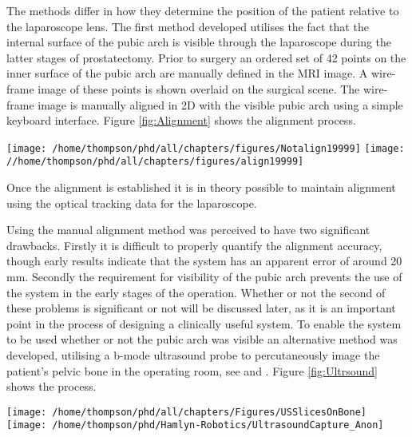 The methods differ in how they determine the position of the patient 
relative to the laparoscope lens. The first method developed utilises the 
fact that the internal surface of the pubic arch is visible through the 
laparoscope during the latter stages of prostatectomy. Prior to surgery an ordered  
set of 42 points on the inner surface of the pubic arch are manually defined in the MRI
image. A wire-frame image of these points is shown overlaid on the surgical scene. The 
wire-frame image is manually aligned in 2D with the visible pubic arch using a simple 
keyboard interface. Figure \ref{fig:Alignment} shows the alignment process. 
\begin{figure*}
\begin{center}
\texttt{[image: /home/thompson/phd/all/chapters/figures/Notalign19999]}
\texttt{[image: //home/thompson/phd/all/chapters/figures/align19999]}
\end{center}
\caption{\label{fig:Alignment}A set of 42 points on the inner surface of the pubic arch 
are manually identified in the MRI image. These form a wire frame that can be projected 
over the surgical scene. A simple user interface is then used to 
align the projected wire frame to the visible anatomy. 
The left hand image shows the wire frame and visible anatomy out of alignment, the right hand
image shows them after alignment. 
Alignment takes less than 30 seconds.}
\end{figure*}
Once the
alignment is established it is in theory possible to maintain alignment using the 
optical tracking data for the laparoscope. 

Using the manual alignment method was perceived to have two significant
drawbacks. Firstly it is 
difficult to properly quantify the alignment accuracy, though early results 
indicate that the system has an apparent error of around 20 mm. Secondly the 
requirement for visibility of the pubic arch prevents the use of the system in the 
early stages of the operation. Whether or not the second of these problems is 
significant or not will be discussed later, as it is an important point 
in the process of designing a clinically useful system.
To enable the system to be used whether or not the pubic arch was visible 
an alternative method was developed, utilising a b-mode ultrasound probe to 
percutaneously image the patient's pelvic bone in the operating room, 
see \cite{pap009} and \cite{pap170}. Figure 
\ref{fig:Ultrsound} shows the process. 
\begin{figure*}
\begin{center}
\texttt{[image: /home/thompson/phd/all/chapters/Figures/USSlicesOnBone]}
\texttt{[image: /home/thompson/phd/Hamlyn-Robotics/UltrasoundCapture\_Anon]}
\end{center}
\caption{\label{fig:Ultrsound}A set of ultrasound images of the patient's pelvic bone 
are acquired immediately prior to surgery, with the patient in the operating position. These
are aligned to a pseudo CT image of the patient's pelvis using an image to image registration 
algorithm.}
\end{figure*}

